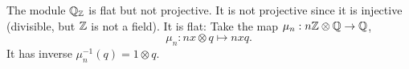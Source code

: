 \begin{example}
  The module $\mathbb{Q}_{\mathbb{Z}}$ is flat but not projective.
  It is not projective since it is injective (divisible, but $\mathbb{Z}$ is not a
  field).
  It is flat:
  Take the map $\mu_n : n \mathbb{Z} \otimes \mathbb{Q} \to \mathbb{Q}$,
  \[
	\mu_n : nx \otimes q \mapsto nxq.
  \]
  It has inverse $\mu_n^{-1}(q) = 1 \otimes q$.
  \boxdot{}
\end{example}

